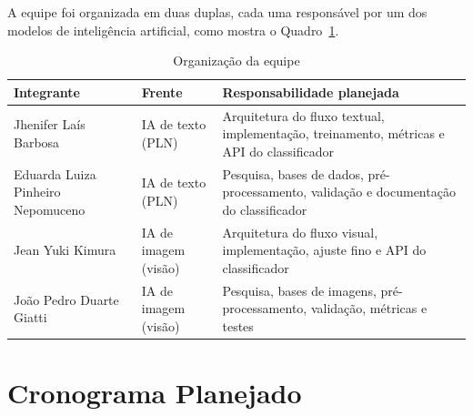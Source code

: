 \documentclass[
    12pt,           %
    oneside,        %
    a4paper,        %
    chapter=TITLE,  %
    english,        %
    brazil          %
]{abntex2}
\begin{document}
A equipe foi organizada em duas duplas, cada uma responsável por um dos
modelos de inteligência artificial, como mostra o Quadro~\ref{tab:equipe}.
\begin{table}[htbp]
\centering
\small
\renewcommand{\arraystretch}{1.3}
\begin{tabular}{|p{4.6cm}|p{3.4cm}|p{5.8cm}|}
\hline
\textbf{Integrante} & \textbf{Frente} & \textbf{Responsabilidade planejada} \\ \hline
Jhenifer Laís Barbosa & IA de texto (PLN) & Arquitetura do fluxo textual, implementação, treinamento, métricas e API do classificador \\ \hline
Eduarda Luiza Pinheiro Nepomuceno & IA de texto (PLN) & Pesquisa, bases de dados, pré-processamento, validação e documentação do classificador \\ \hline
Jean Yuki Kimura & IA de imagem (visão) & Arquitetura do fluxo visual, implementação, ajuste fino e API do classificador \\ \hline
João Pedro Duarte Giatti & IA de imagem (visão) & Pesquisa, bases de imagens, pré-processamento, validação, métricas e testes \\ \hline
\end{tabular}
\caption{Organização da equipe}
\label{tab:equipe}
\end{table}

\section{Cronograma Planejado}
\end{document}
